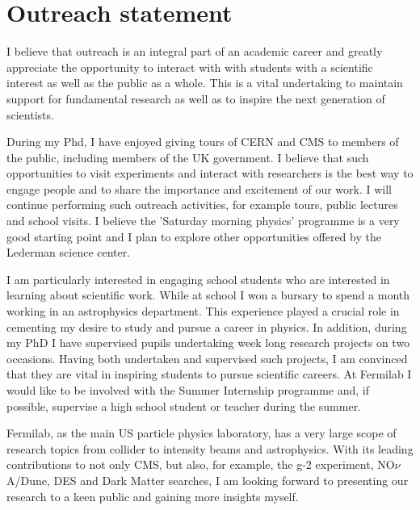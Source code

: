 \documentclass[12pt]{article}
\theoremstyle{plain} \numberwithin{equation}{section}
\theoremstyle{definition}
\begin{document}
\section*{Outreach statement}
\noindent 
I believe that outreach is an integral part of an academic career and greatly appreciate the opportunity 
to interact with with students with a scientific interest as well as the public as a whole. This is a vital 
undertaking to maintain support for fundamental research as well as to inspire the next generation of scientists.

During my Phd, I have enjoyed giving tours of CERN and CMS to members of the public, 
including members of the UK government. I believe that such opportunities to visit experiments
and interact with researchers is the best way to engage people and to share the importance and 
excitement of our work. I will continue performing such outreach activities, for example tours, 
public lectures and school visits. I believe the  ’Saturday morning physics’ programme is a very
good starting point and I plan to explore other opportunities offered by the Lederman science center. 

I am particularly interested in engaging school students who are interested in learning 
about scientific work. While at school I won a bursary to spend a month working in an 
astrophysics department. This experience played a crucial role in cementing my desire
to study and pursue a career in physics. In addition, during my PhD I have supervised pupils undertaking 
week long research projects on two occasions. Having both undertaken and supervised such projects, I am convinced that they are vital 
in inspiring students to pursue scientific careers. At Fermilab I would like to be involved 
with the Summer Internship programme and, if possible, supervise a high school student or teacher during the summer.

Fermilab, as the main US particle physics laboratory, has a very large scope of research topics from 
collider to intensity beams and astrophysics. With its leading contributions to not only CMS, but also, 
for example, the g-2 experiment, NO$\nu$A/Dune, DES and Dark Matter searches, I am looking forward to presenting our 
research to a keen public and gaining more insights myself.
\end{document}
